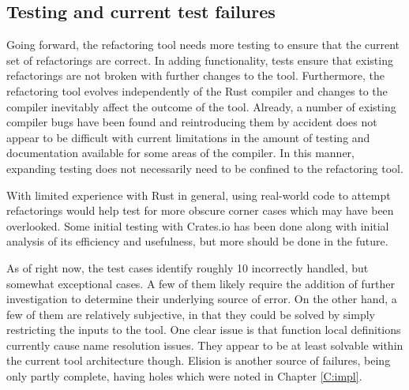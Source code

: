 
\subsection{Testing and current test failures}
Going forward, the refactoring tool needs more testing to ensure that the current set of refactorings are correct. In adding functionality, tests ensure that existing refactorings are not broken with further changes to the tool. Furthermore, the refactoring tool evolves independently of the Rust compiler and changes to the compiler inevitably affect the outcome of the tool. Already, a number of existing compiler bugs have been found and reintroducing them by accident does not appear to be difficult with current limitations in the amount of testing and documentation available for some areas of the compiler. In this manner, expanding testing does not necessarily need to be confined to the refactoring tool. 


With limited experience with Rust in general, using real-world code to attempt refactorings would help test for more obscure corner cases which may have been overlooked. Some initial testing with Crates.io \cite{cratesio15} has been done along with initial analysis of its efficiency and usefulness, but more should be done in the future. 


As of right now, the test cases identify roughly 10 incorrectly handled, but somewhat exceptional cases. A few of them likely require the addition of further investigation to determine their underlying source of error. On the other hand, a few of them are relatively subjective, in that they could be solved by simply restricting the inputs to the tool. One clear issue is that function local definitions currently cause name resolution issues. They appear to be at least solvable within the current tool architecture though. Elision is another source of failures, being only partly complete, having holes which were noted in Chapter \ref{C:impl}.


